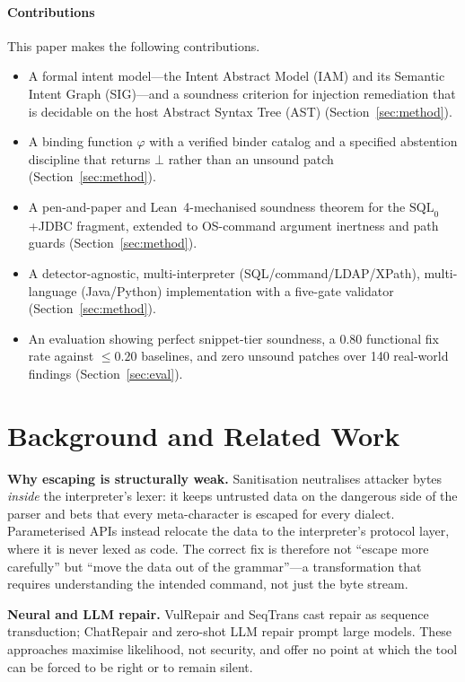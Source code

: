 \documentclass[conference]{IEEEtran}
\newcommand{\bottom}{\ensuremath{\bot}}
\begin{document}
\paragraph*{Contributions} This paper makes the following contributions.
\begin{itemize}
  \item A formal intent model---the Intent Abstract Model (IAM) and its
  Semantic Intent Graph (SIG)---and a soundness criterion for injection
  remediation that is decidable on the host Abstract Syntax Tree (AST)
  (Section~\ref{sec:method}).
  \item A binding function $\varphi$ with a verified binder catalog and a
  specified abstention discipline that returns \bottom{} rather than an
  unsound patch (Section~\ref{sec:method}).
  \item A pen-and-paper and Lean~4-mechanised soundness theorem for the
  $\mathrm{SQL}_0$+JDBC fragment, extended to OS-command argument
  inertness and path guards (Section~\ref{sec:method}).
  \item A detector-agnostic, multi-interpreter (SQL/command/LDAP/XPath),
  multi-language (Java/Python) implementation with a five-gate validator
  (Section~\ref{sec:method}).
  \item An evaluation showing perfect snippet-tier soundness, a $0.80$
  functional fix rate against $\le 0.20$ baselines, and zero unsound
  patches over 140 real-world findings
  (Section~\ref{sec:eval}).
\end{itemize}

\section{Background and Related Work}
\textbf{Why escaping is structurally weak.} Sanitisation neutralises
attacker bytes \emph{inside} the interpreter's lexer: it keeps untrusted
data on the dangerous side of the parser and bets that every
meta-character is escaped for every dialect. Parameterised APIs instead
relocate the data to the interpreter's protocol layer, where it is never
lexed as code. The correct fix is therefore not ``escape more carefully''
but ``move the data out of the grammar''---a transformation that requires
understanding the intended command, not just the byte stream.

\textbf{Neural and LLM repair.} VulRepair \cite{fu2022vulrepair} and
SeqTrans \cite{chi2023seqtrans} cast repair as sequence transduction;
ChatRepair \cite{xia2023chatrepair} and zero-shot LLM repair
\cite{pearce2023examining} prompt large models. These approaches maximise
likelihood, not security, and offer no point at which the tool can be
forced to be right or to remain silent.
\end{document}
